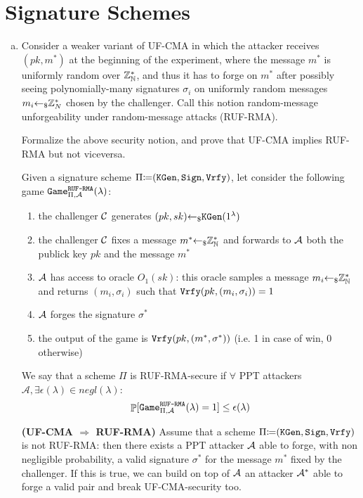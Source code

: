 \section{Signature Schemes}
\begin{enumerate}[(a)]
	\item Consider a weaker variant of UF-CMA in which the attacker receives $(pk, m^*)$ at the beginning of the experiment, where the message $m^*$ is uniformly random over ${\mathbb Z}^*_{\mathbb N}$, and thus it has to forge on $m^*$ after possibly seeing polynomially-many signatures $\sigma_i$	on uniformly random messages $m_i {\leftarrow_\$} {\mathbb Z}^*_N$ chosen by the challenger. Call this notion random-message unforgeability under random-message attacks (RUF-RMA).

	Formalize the above security notion, and prove that UF-CMA implies RUF-RMA but not viceversa.
	
	\begin{solution}
		Given a signature scheme $\Pi {\coloneqq} (\texttt{KGen}, \texttt{Sign}, \texttt{Vrfy})$, let consider the following game $\texttt{Game}_{\Pi, \mathcal{A}}^{\texttt{RUF-RMA}}(\lambda)$:
		\begin{enumerate}
			\item the challenger $\mathcal{C}$ generates $(pk, sk) {\leftarrow_\$} \texttt{KGen}(1^\lambda)$
			\item the challenger $\mathcal{C}$ fixes a message $m^* {\leftarrow_\$} {\mathbb Z}^*_{\mathbb N}$ and forwards to $\mathcal{A}$ both the publick key $pk$ and the message $m^*$
			\item $\mathcal{A}$ has access to oracle $O_1(sk)$: this oracle samples a message $m_i {\leftarrow_\$} {\mathbb Z}_{\mathbb N}^*$ and returns $(m_i, \sigma_i)$ such that $\texttt{Vrfy}(pk, (m_i, \sigma_i)) = 1$
			\item $\mathcal{A}$ forges the signature $\sigma^*$
			\item the output of the game is $\texttt{Vrfy}(pk, (m^*, \sigma^*))$ (i.e. 1 in case of win, 0 otherwise)
		\end{enumerate}
		We say that a scheme $\Pi$ is RUF-RMA-secure if $\forall$ PPT attackers $\mathcal{A}, \exists \epsilon(\lambda) \in negl(\lambda)$:
		\[\mathop{\mathbb P}[\texttt{Game}_{\Pi, \mathcal{A}}^{\texttt{RUF-RMA}}(\lambda) = 1] \le \epsilon(\lambda) \]

		\bigskip
		\textbf{(UF-CMA $\Rightarrow$ RUF-RMA)} Assume that a scheme $\Pi {\coloneqq} (\texttt{KGen}, \texttt{Sign}, \texttt{Vrfy})$ is not RUF-RMA: then there exists a PPT attacker $\mathcal{A}$ able to forge, with non negligible probability, a valid signature $\sigma^*$ for the message $m^*$ fixed by the challenger. If this is true, we can build on top of $\mathcal{A}$ an attacker $\mathcal{A}^*$ able to forge a valid pair and break UF-CMA-security too.
		

\end{solution}
\end{enumerate}
